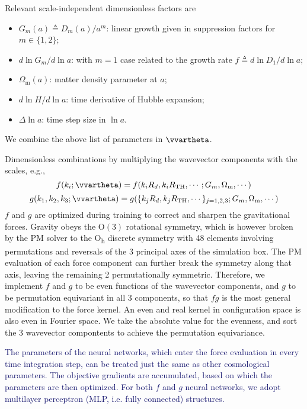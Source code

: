 \documentclass[modern, trackchanges, dvipsnames]{aastex631}
\renewcommand{\d}{d}
\newcommand{\lna}{\ln\!a}
\newcommand{\Omegam}{\Omega_\mathrm{m}}
\newcommand{\tophat}{\mathrm{TH}}
\newcommand{\YZ}[1]{\textcolor{MidnightBlue}{#1}}
\begin{document}
Relevant scale-independent dimensionless factors are
\begin{itemize}
\item $G_m(a) \triangleq D_m(a) / a^m$: linear growth given in
  suppression factors for $m \in \{1, 2\}$;
\item $\d\ln G_m / \d\lna$: with $m=1$ case related to the growth rate
  $f \triangleq \d\ln D_1 / \d\lna$;
\item $\Omegam(a)$: matter density parameter at $a$;
\item $\d\ln\!H / \d\lna$: time derivative of Hubble expansion;
\item $\Delta\lna$: time step size in $\lna$.
\end{itemize}

We combine the above list of parameters in $\vvartheta$.

Dimensionless combinations by multiplying the wavevector components with the
scales, e.g.,
%
\begin{equation}
f(k_i; \vvartheta) = f(k_iR_d, k_iR_\tophat, \cdots; G_m, \Omegam, \cdots)
\end{equation}
%
\begin{equation}
g(k_1, k_2, k_3; \vvartheta) = g(\{k_jR_d, k_jR_\tophat, \cdots\}_{j=1,2,3}; G_m, \Omegam, \cdots)
\end{equation}
%
$f$ and $g$ are optimized during training to correct and sharpen the
gravitational forces.
Gravity obeys the $\mathrm{O}(3)$ rotational symmetry, which is however
broken by the PM solver to the O\textsubscript{h} discrete symmetry with
48 elements involving permutations and reversals of the 3 principal axes
of the simulation box.
The PM evaluation of each force component can further break the symmetry
along that axis, leaving the remaining 2 permutationally symmetric.
Therefore, we implement $f$ and $g$ to be even functions of the
wavevector components, and $g$ to be permutation equivariant in all 3
components, so that $f g$ is the most general modification to the force
kernel.
An even and real kernel in configuration space is also even in Fourier
space.
We take the absolute value for the evenness, and sort the 3 wavevector
compontents to achieve the permutation equivariance.

\YZ{
The parameters of the neural networks, which enter the force evaluation in
every time integration step, can be treated just the same as other cosmological
parameters.
The objective gradients are accumulated, based on which the parameters are then
optimized.
For both $f$ and $g$ neural networks, we adopt multilayer perceptron (MLP, i.e.
fully connected) structures.
}
\end{document}
